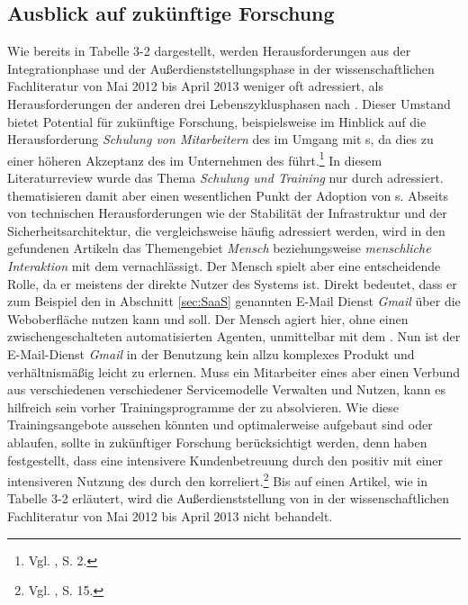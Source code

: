 \subsection{Ausblick auf zukünftige Forschung}
\label{sec:Zukunft}
Wie bereits in Tabelle 3-2 dargestellt, werden Herausforderungen aus der Integrationphase und der Außerdienststellungsphase in der wissenschaftlichen Fachliteratur von Mai 2012 bis April 2013 weniger oft adressiert, als Herausforderungen der anderen drei Lebenszyklusphasen nach \cite{Schneider.2013}.
\newline
Dieser Umstand bietet Potential für zukünftige Forschung, beispielsweise im Hinblick auf die Herausforderung \emph{Schulung von Mitarbeitern} des \CSUs im Umgang mit \Cs s, da dies zu einer höheren Akzeptanz des \CSs im Unternehmen des \CSUs führt.\footnote{Vgl. \cite{Conboy.2012}, S. 2.} 
\newline
In diesem Literaturreview wurde das Thema \emph{Schulung und Training} nur durch \cite{Conboy.2012} adressiert. 
\cite{Conboy.2012} thematisieren damit aber einen wesentlichen Punkt der Adoption von \Cs s. 
Abseits von technischen Herausforderungen wie der Stabilität der \CC Infrastruktur und der Sicherheitsarchitektur, die vergleichsweise häufig adressiert werden, wird in den gefundenen Artikeln das Themengebiet \emph{Mensch} beziehungsweise \emph{menschliche Interaktion} mit dem \CS vernachlässigt.
Der Mensch spielt aber eine entscheidende Rolle, da er meistens der direkte Nutzer des Systems ist. 
Direkt bedeutet, dass er zum Beispiel den in Abschnitt \ref{sec:SaaS} genannten E-Mail Dienst \emph{Gmail} über die Weboberfläche nutzen kann und soll. Der Mensch agiert hier, ohne einen zwischengeschalteten automatisierten Agenten, unmittelbar mit dem \Cs . 
Nun ist der E-Mail-Dienst \emph{Gmail} in der Benutzung kein allzu komplexes Produkt und verhältnismäßig leicht zu erlernen. Muss ein Mitarbeiter eines \CSUs aber einen Verbund aus verschiedenen \CSs verschiedener Servicemodelle Verwalten und Nutzen, kann es hilfreich sein vorher Trainingsprogramme der \CSP zu absolvieren. 
Wie diese Trainingsangebote aussehen könnten und optimalerweise aufgebaut sind oder ablaufen, sollte in zukünftiger Forschung berücksichtigt werden, denn \cite{Retana.2012} haben festgestellt, dass eine intensivere Kundenbetreuung durch den \CSP positiv mit einer intensiveren Nutzung des \CSs durch den \CSU korreliert.\footnote{Vgl. \cite{Retana.2012}, S. 15.}
\newline
\newline
Bis auf einen Artikel, wie in Tabelle 3-2 erläutert, wird die Außerdienststellung von \CSs in der wissenschaftlichen Fachliteratur von Mai 2012 bis April 2013 nicht behandelt. 
